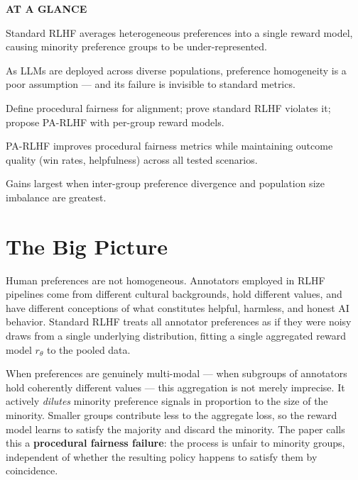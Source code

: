 \documentclass[10pt,twocolumn]{article}
\begin{document}
\begin{mdframed}[backgroundcolor=boxgray,linecolor=rulered,linewidth=1pt,
    innerleftmargin=6pt,innerrightmargin=6pt,
    innertopmargin=6pt,innerbottommargin=6pt]
\textbf{\small AT A GLANCE}\par\vspace{4pt}
\begin{description}[leftmargin=0pt,labelsep=4pt,itemsep=2pt,parsep=0pt,
    font=\small\bfseries]
  \item[Problem:] Standard RLHF averages heterogeneous preferences into a single reward
    model, causing minority preference groups to be under-represented.
  \item[Why it matters:] As LLMs are deployed across diverse populations, preference
    homogeneity is a poor assumption — and its failure is invisible to standard metrics.
  \item[Method:] Define procedural fairness for alignment; prove standard RLHF violates it;
    propose PA-RLHF with per-group reward models.
  \item[Result:] PA-RLHF improves procedural fairness metrics while maintaining outcome
    quality (win rates, helpfulness) across all tested scenarios.
  \item[Evidence:] Gains largest when inter-group preference divergence and population
    size imbalance are greatest.
\end{description}
\end{mdframed}

\section{The Big Picture}

Human preferences are not homogeneous. Annotators employed in RLHF pipelines come from
different cultural backgrounds, hold different values, and have different conceptions
of what constitutes helpful, harmless, and honest AI behavior. Standard RLHF treats all
annotator preferences as if they were noisy draws from a single underlying distribution,
fitting a single aggregated reward model $r_\theta$ to the pooled data.

When preferences are genuinely multi-modal — when subgroups of annotators hold coherently
different values — this aggregation is not merely imprecise. It actively \emph{dilutes}
minority preference signals in proportion to the size of the minority. Smaller groups
contribute less to the aggregate loss, so the reward model learns to satisfy the majority
and discard the minority. The paper calls this a \textbf{procedural fairness failure}:
the process is unfair to minority groups, independent of whether the resulting policy
happens to satisfy them by coincidence.
\end{document}
